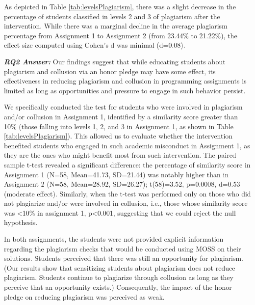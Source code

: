 As depicted in Table \ref{tab:levelsPlagiarism}, there was a slight decrease in the percentage of students classified in levels 2 and 3 of plagiarism after the intervention. While there was a marginal decline in the average plagiarism percentage from Assignment 1 to Assignment 2 (from 23.44\% to 21.22\%), the effect size computed using Cohen's d was minimal (d=0.08). 

\vspace{4pt}
\begin{mdframed}
\textbf{\textit{RQ2 Answer:}} Our findings suggest that while educating students about plagiarism and collusion via an honor pledge may have some effect, its effectiveness in reducing plagiarism and collusion in programming assignments is limited as long as opportunities and pressure to engage in such behavior persist.
\end{mdframed}
\vspace{4pt}


We specifically conducted the test for students who were involved in plagiarism and/or collusion in Assignment 1, identified by a similarity score greater than 10\% (those falling into levels 1, 2, and 3 in Assignment 1, as shown in Table \ref{tab:levelsPlagiarism}). This allowed us to evaluate whether the intervention benefited students who engaged in such academic misconduct in Assignment 1, as they are the ones who might benefit most from such intervention. The paired sample t-test revealed a significant difference: the percentage of similarity score in Assignment 1 (N=58, Mean=41.73, SD=21.44) was notably higher than in Assignment 2 (N=58, Mean=28.92, SD=26.27); t(58)=3.52, p=0.0008, d=0.53 (moderate effect). Similarly, when the t-test was performed only on those who did not plagiarize and/or were involved in collusion, i.e., those whose similarity score was <10\% in assignment 1, p<0.001, suggesting that we could reject the null hypothesis. 




In both assignments, the students were not provided explicit information regarding the plagiarism checks that would be conducted using MOSS on their solutions. Students perceived that there was still an opportunity for plagiarism.
\color{blue}(Our results show that sensitizing students about plagiarism does not reduce plagiarism. Students continue to plagiarize through collusion as long as they perceive that an opportunity exists.)\color{black}
Consequently, the impact of the honor pledge on reducing plagiarism was perceived as weak.


